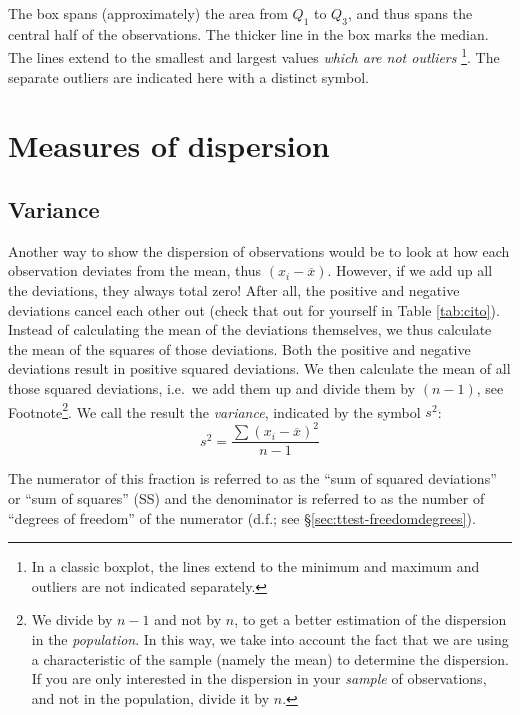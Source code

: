\documentclass[
]{book}
\begin{document}
The box spans (approximately) the area from \(Q_1\) to \(Q_3\), and
thus spans the central half of the observations. The thicker line in the
box marks the median. The lines extend to the smallest and largest
values \emph{which are not outliers} \footnote{In a classic boxplot, the lines extend to the minimum and maximum \citep{Tukey77} and
  outliers are not indicated separately.}. The separate outliers
are indicated here with a distinct symbol.

\hypertarget{sec:measures-of-dispersion}{%
\section{Measures of dispersion}\label{sec:measures-of-dispersion}}

\hypertarget{sec:variance}{%
\subsection{Variance}\label{sec:variance}}

Another way to show the dispersion of observations would be to look at how
each observation deviates from the mean, thus \((x_i-\overline{x})\). However, if we
add up all the deviations, they always total zero! After all, the positive and negative
deviations cancel each other out (check that out for yourself in
Table \ref{tab:cito}).
Instead of calculating the mean of the deviations themselves, we thus calculate the mean
of the squares of those deviations. Both the positive and negative deviations
result in positive squared deviations. We then calculate the mean of all
those squared deviations, i.e.~we add them up and divide them by
\((n-1)\), see Footnote\footnote{We divide by \(n-1\) and not by \(n\), to get a better estimation of the dispersion in the
  \emph{population}. In this way, we take into account the fact that we are using a characteristic of the
  sample (namely the mean) to determine the dispersion. If you are only interested in the
  dispersion in your \emph{sample} of observations, and not in the population, divide it by \(n\).}. We call the result the
\emph{variance}, indicated by the symbol \(s^2\):
\begin{equation}
  s^2 = \frac{ \sum (x_i - \overline{x})^2 } {n-1}
  \label{eq:variance}
\end{equation}

The numerator of
this fraction is referred to as the ``sum of squared deviations'' or
``sum of squares'' (SS) and the denominator is referred to as the number of
``degrees of freedom'' of the numerator (d.f.; see
§\ref{sec:ttest-freedomdegrees}).
\end{document}
